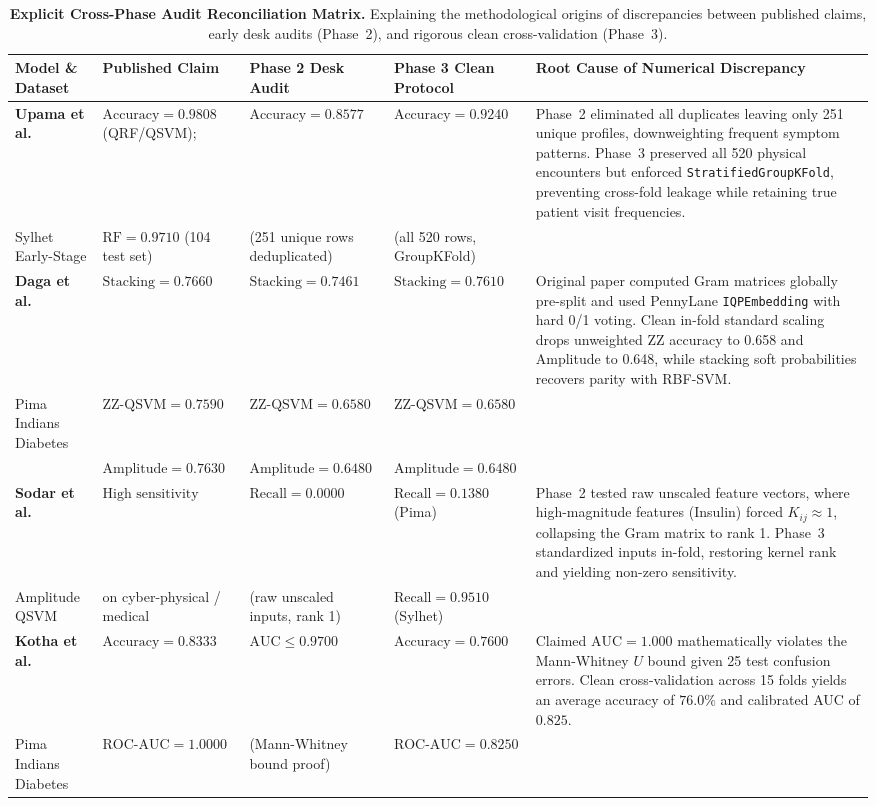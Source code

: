 \documentclass[journal,twocolumn]{IEEEtran}
\begin{document}
\begin{table}[htbp]
\centering\footnotesize
\caption{\textbf{Explicit Cross-Phase Audit Reconciliation Matrix.} Explaining the methodological origins of discrepancies between published claims, early desk audits (Phase~2), and rigorous clean cross-validation (Phase~3).}
\label{tab:reconciliation_summary}
\begin{adjustbox}{width=\textwidth}
\begin{tabular}{lp{3.5cm}p{3.5cm}p{3.5cm}p{5.5cm}}
\toprule
\textbf{Model \& Dataset} & \textbf{Published Claim} & \textbf{Phase 2 Desk Audit} & \textbf{Phase 3 Clean Protocol} & \textbf{Root Cause of Numerical Discrepancy} \\
\midrule
\textbf{Upama et al.} & $\text{Accuracy} = 0.9808$ (QRF/QSVM); & $\text{Accuracy} = 0.8577$ & $\text{Accuracy} = 0.9240$ & Phase~2 eliminated all duplicates leaving only 251 unique profiles, downweighting frequent symptom patterns. Phase~3 preserved all 520 physical encounters but enforced \texttt{StratifiedGroupKFold}, preventing cross-fold leakage while retaining true patient visit frequencies. \\
Sylhet Early-Stage & $\text{RF} = 0.9710$ (104 test set) & (251 unique rows deduplicated) & (all 520 rows, GroupKFold) & \\
\midrule
\textbf{Daga et al.} & $\text{Stacking} = 0.7660$ & $\text{Stacking} = 0.7461$ & $\text{Stacking} = 0.7610$ & Original paper computed Gram matrices globally pre-split and used PennyLane \texttt{IQPEmbedding} with hard 0/1 voting. Clean in-fold standard scaling drops unweighted ZZ accuracy to 0.658 and Amplitude to 0.648, while stacking soft probabilities recovers parity with RBF-SVM. \\
Pima Indians Diabetes & $\text{ZZ-QSVM} = 0.7590$ & $\text{ZZ-QSVM} = 0.6580$ & $\text{ZZ-QSVM} = 0.6580$ & \\
& $\text{Amplitude} = 0.7630$ & $\text{Amplitude} = 0.6480$ & $\text{Amplitude} = 0.6480$ & \\
\midrule
\textbf{Sodar et al.} & $\text{High sensitivity claimed}$ & $\text{Recall} = 0.0000$ & $\text{Recall} = 0.1380$ (Pima) & Phase~2 tested raw unscaled feature vectors, where high-magnitude features (Insulin) forced $K_{ij} \approx 1$, collapsing the Gram matrix to rank 1. Phase~3 standardized inputs in-fold, restoring kernel rank and yielding non-zero sensitivity. \\
Amplitude QSVM & on cyber-physical / medical & (raw unscaled inputs, rank 1) & $\text{Recall} = 0.9510$ (Sylhet) & \\
\midrule
\textbf{Kotha et al.} & $\text{Accuracy} = 0.8333$ & $\text{AUC} \le 0.9700$ & $\text{Accuracy} = 0.7600$ & Claimed $\text{AUC} = 1.000$ mathematically violates the Mann-Whitney $U$ bound given 25 test confusion errors. Clean cross-validation across 15 folds yields an average accuracy of $76.0\%$ and calibrated AUC of $0.825$. \\
Pima Indians Diabetes & $\text{ROC-AUC} = 1.0000$ & (Mann-Whitney bound proof) & $\text{ROC-AUC} = 0.8250$ & \\
\bottomrule
\end{tabular}
\end{adjustbox}
\end{table}
\end{document}
